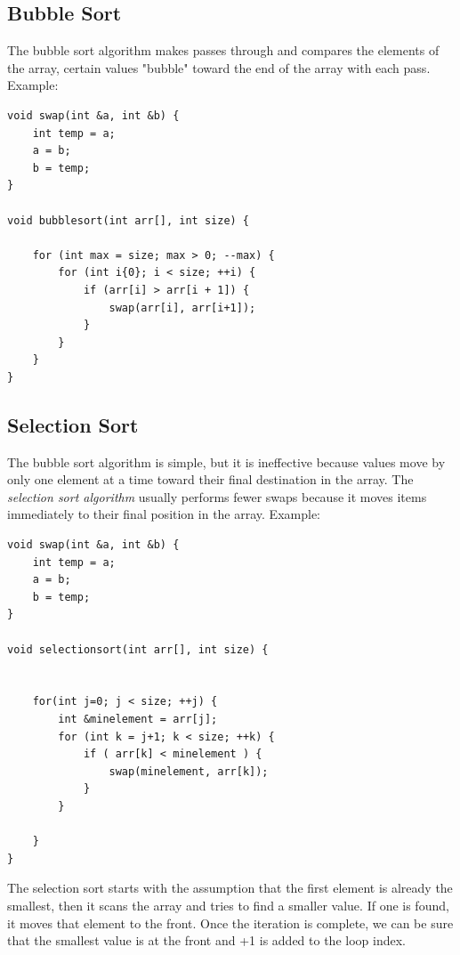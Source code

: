 \documentclass{report}
\begin{document}
    \pagebreak \bigbreak \noindent 
    \subsection{Bubble Sort}
    \bigbreak \noindent 
    The bubble sort algorithm makes passes through and compares the elements of the array, certain values "bubble" toward the end of the array with each pass.
    \bigbreak \noindent 
    Example:
    \bigbreak \noindent 
    \sepline
    \begin{verbatim}
void swap(int &a, int &b) {
    int temp = a;
    a = b;
    b = temp;
}

void bubblesort(int arr[], int size) {

    for (int max = size; max > 0; --max) {
        for (int i{0}; i < size; ++i) {
            if (arr[i] > arr[i + 1]) {
                swap(arr[i], arr[i+1]);
            }
        }
    } 
}
    \end{verbatim}
    \sepline

    \bigbreak \noindent 
    \subsection{Selection Sort}
    \bigbreak \noindent 
    The bubble sort algorithm is simple, but it is ineffective because values move by only one element at a time toward their final destination in the array. The \textit{selection sort algorithm} usually performs fewer swaps because it moves items immediately to their final position in the array. 
    \bigbreak \noindent 
    Example:
    \bigbreak \noindent 
    \sepline
    \begin{verbatim}
void swap(int &a, int &b) {
    int temp = a;
    a = b;
    b = temp;
}

void selectionsort(int arr[], int size) {


    for(int j=0; j < size; ++j) {
        int &minelement = arr[j];
        for (int k = j+1; k < size; ++k) {
            if ( arr[k] < minelement ) {
                swap(minelement, arr[k]);
            }
        }

    }
}
    \end{verbatim}
    \sepline

    \pagebreak \bigbreak \noindent 
    The selection sort starts with the assumption that the first element is already the smallest, then it scans the array and tries to find a smaller value. If one is found, it moves that element to the front. Once the iteration is complete, we can be sure that the smallest value is at the front and +1 is added to the loop index.
\end{document}

